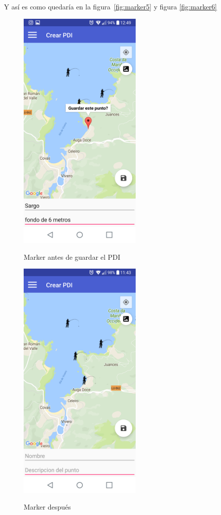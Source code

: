  
 
 Y así es como quedaría en la figura~\ref{fig:marker5} y figura \ref{fig:marker6}

 
 
 
	\begin{figure}
\begin{minipage}[b]{0.5\linewidth} %
\centering
\includegraphics[width=6cm]{capturamovil/pdiguardar.png}
 \label{fig:marker5}
\caption{Marker antes de guardar el PDI}

\end{minipage}
\hspace{0.5cm} %
\begin{minipage}[b]{0.5\linewidth}
\centering
\includegraphics[width=6cm]{capturamovil/pdiguardar2.png}
 \label{fig:marker6}
\caption{Marker después }

\end{minipage}
		\label{fig:marker}

\end{figure} 
 
